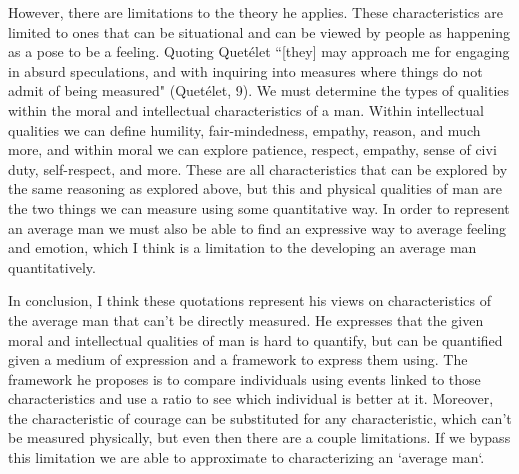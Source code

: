 \documentclass[11pt, oneside]{article}
\begin{document}
\par However, there are limitations to the theory he applies. These characteristics are limited to ones that can be situational and can be viewed by people as happening as a pose to be a feeling. Quoting Quet\'{e}let ``[they] may approach me for engaging in absurd speculations, and with inquiring into measures where things do not admit of being measured" (Quet\'{e}let, 9). We must determine the types of qualities within the moral and intellectual characteristics of a man. Within intellectual qualities we can define humility, fair-mindedness, empathy, reason, and much more, and within moral we can explore patience, respect, empathy, sense of civi duty, self-respect, and more. These are all characteristics that can be explored by the same reasoning as explored above, but this and physical qualities of man are the two things we can measure using some quantitative way. In order to represent an average man we must also be able to find an expressive way to average feeling and emotion, which I think is a limitation to the developing an average man quantitatively. 

\par In conclusion, I think these quotations represent his views on characteristics of the average man that can't be directly measured. He expresses that the given moral and intellectual qualities of man is hard to quantify, but can be quantified given a medium of expression and a framework to express them using. The framework he proposes is to compare individuals using events linked to those characteristics and use a ratio to see which individual is better at it. Moreover, the characteristic of courage can be substituted for any characteristic, which can't be measured physically, but even then there are a couple limitations. If we bypass this limitation we are able to approximate to characterizing an `average man`.
\end{document}
